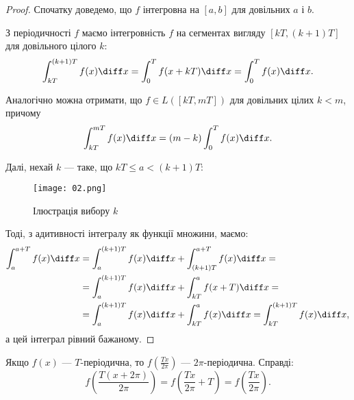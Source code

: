 \begin{proof}
    Спочатку доведемо, що $f$ інтегровна на $[a, b]$ для довільних $a$ і $b$. \medskip
    
    З періодичності $f$ маємо інтегровність $f$ на сегментах вигляду $[k T, (k + 1) T]$ для довільного цілого $k$:
    \begin{equation}
        \int_{k T}^{(k + 1) T} f(x) \diff x = \int_0^T f(x + k T) \diff x = \int_0^T f(x) \diff x.
    \end{equation}
    
    \begin{remark}
        Аналогічно можна отримати, що $f \in L([k T, m T])$ для довільних цілих $k < m$, причому 
        \begin{equation}
            \int_{k T}^{m T} f(x) \diff x = (m - k) \int_0^T f(x) \diff x.
        \end{equation}
    \end{remark}
    
    Далі, нехай $k$ --- таке, що $k T \le a < (k + 1) T$:
    \begin{figure}[H]
        \centering
        \texttt{[image: 02.png]}
        \caption{Ілюстрація вибору $k$}
    \end{figure}
    
    Тоді, з адитивності інтегралу як функції множини, маємо:
    \begin{equation}
        \begin{aligned}
            \int_a^{a + T} f(x) \diff x
            &= \int_a^{(k + 1) T} f(x) \diff x + \int_{(k + 1) T}^{a + T} f(x) \diff x = \\
            &= \int_a^{(k + 1) T} f(x) \diff x + \int_{k T}^{a} f(x + T) \diff x = \\
            &= \int_a^{(k + 1) T} f(x) \diff x + \int_{k T}^{a} f(x) \diff x = \int_{k T}^{(k + 1) T} f(x) \diff x,
        \end{aligned}
    \end{equation}
    а цей інтеграл рівний бажаному.
\end{proof}

\begin{remark}
    Якщо $f(x)$ --- $T$-періодична, то $f(\frac{T x}{2 \pi})$ --- $2\pi$-періодична. Справді:
    \begin{equation}
        f \left( \frac{T (x + 2 \pi)}{2 \pi} \right) = f \left( \frac{T x}{2 \pi} + T \right) = f \left( \frac{T x}{2 \pi} \right).
    \end{equation}
\end{remark}

